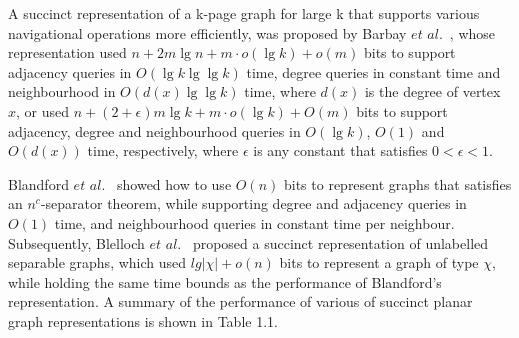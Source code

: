 \documentclass[12pt,glossary]{dalthesis}
\begin{document}
\bigskip
\bigskip

A succinct representation of a k-page graph for large k that supports various navigational operations more efficiently, was proposed by Barbay $et$ $al.$~\cite{Barbay}, whose representation used $n+2m\lg n + m \cdot o(\lg k) + o(m)$ bits to support adjacency queries in $O(\lg k \lg \lg k)$ time, degree queries in constant time and neighbourhood in $O(d(x) \lg \lg k)$ time, where $d(x)$ is the degree of vertex $x$, or used $n+(2+\epsilon)m\lg k + m \cdot o(\lg k) + O(m)$ bits to support adjacency, degree and neighbourhood queries in $O(\lg k)$, $O(1)$ and $O(d(x))$ time, respectively, where $\epsilon$ is any constant that satisfies $0< \epsilon <1$.   

\bigskip
\bigskip

Blandford $et$ $al.$~\cite{compact-representation} showed how to use $O(n)$ bits to represent graphs that satisfies an $n^{c}$-separator theorem, while supporting degree and adjacency queries in $O(1)$ time, and neighbourhood queries in constant time per neighbour. Subsequently, Blelloch $et$ $al.$~\cite{succinct-representation} proposed a succinct representation of unlabelled separable graphs, which used $lg| \chi |+ o(n)$ bits to represent a graph of type $\chi$, while holding the same time bounds as the performance of Blandford's representation. A summary of the performance of various of succinct planar graph representations is shown in Table 1.1.
    
\end{document}

